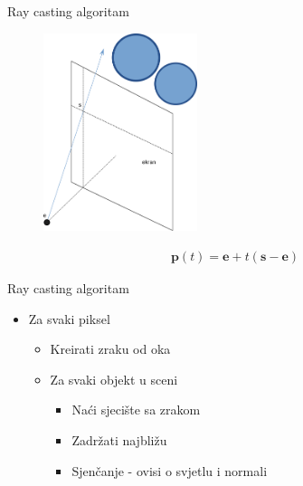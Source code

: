 \documentclass[9pt]{beamer}
\begin{document}
\begin{frame}{Ray casting algoritam}
\begin{figure}
	\includegraphics[width=0.4\textwidth]{./slike/zraka.png}
\end{figure}
\begin{align*}
	\textbf{p}(t) = \textbf{e} + t(\textbf{s} - \textbf{e})
\end{align*}
\end{frame}

\begin{frame}{Ray casting algoritam}
\begin{itemize}
	\item Za svaki piksel
	\begin{itemize}
		\item Kreirati zraku od oka
		\item \alert{Za svaki objekt u sceni}
		\begin{itemize}
			\item Naći sjecište sa zrakom
			\item Zadržati najbližu
			\item Sjenčanje - ovisi o svjetlu i normali
		\end{itemize}
	\end{itemize}
\end{itemize}
\end{frame}
\end{document}
